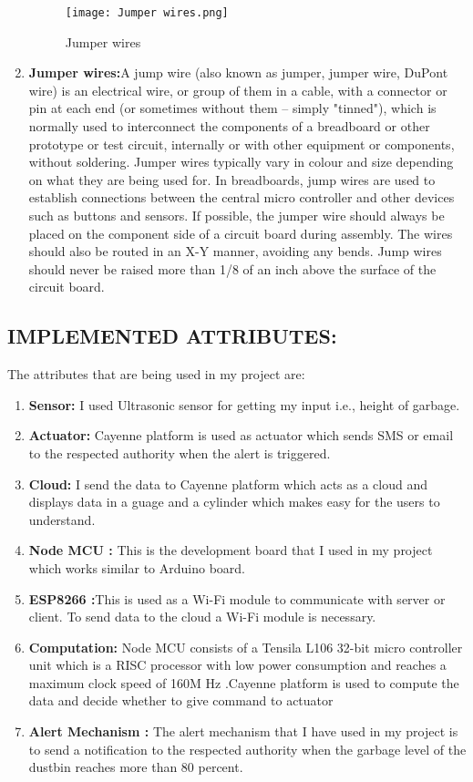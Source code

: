 \documentclass[12pt,letterpaper]{article}
\begin{document}
\begin{enumerate}
    \begin{figure}[h!]
        \centering
        \texttt{[image: Jumper wires.png]}
        \caption{Jumper wires}
        \label{fig:image3}
    \end{figure}
    \item \textbf{Jumper wires:}A jump wire (also known as jumper, jumper wire, DuPont wire) is an electrical wire, or group of them in a cable, with a connector or pin at each end (or sometimes without them – simply "tinned"), which is normally used to interconnect the components of a breadboard or other prototype or test circuit, internally or with other equipment or components, without soldering. Jumper wires typically vary in colour and size depending on what they are being used for. In breadboards, jump wires are used to establish connections between the central micro controller and other devices such as buttons and sensors. If possible, the jumper wire should always be placed on the component side of a circuit board during assembly. The wires should also be routed in an X-Y manner, avoiding any bends. Jump wires should never be raised more than 1/8 of an inch above the surface of the circuit board.
    
\end{enumerate}


\subsection{IMPLEMENTED ATTRIBUTES:}
The attributes that are being used in my project are:
\begin{enumerate}
    \item \textbf{Sensor:} I used Ultrasonic sensor for getting my input i.e., height of garbage.
    \item \textbf{Actuator:} Cayenne platform is used as actuator which sends SMS or email to the respected authority when the alert is triggered.
    \item \textbf{Cloud:} I send the data to Cayenne platform which acts as a cloud and displays data in a guage and a cylinder which makes easy for the users to understand.
    \item \textbf{Node MCU :} This is the development board that I used in my project which works similar to Arduino board.
    \item \textbf{ESP8266 :}This is used as a Wi-Fi module to communicate with server or client. To send data to the cloud a Wi-Fi module is necessary.
    \item \textbf{Computation:} Node MCU consists of a Tensila L106 32-bit micro controller unit which is a RISC processor with low power consumption and reaches a maximum clock speed of 160M Hz .Cayenne platform is used to compute the data and decide whether to give command to actuator
    \item \textbf{Alert Mechanism :} The alert mechanism that I have used in my project is to send a notification to the respected authority when the garbage level of the dustbin reaches more than 80 percent.
\end{enumerate}
\end{document}
